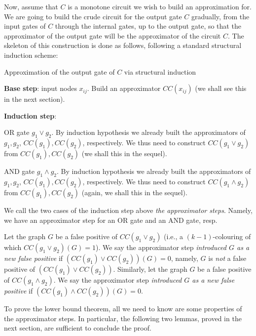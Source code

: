  

Now, assume that $C$ is a monotone circuit we wish to build an approximation for. We are going to build the crude circuit for the output gate $C$ gradually, from the input gates of $C$  through the internal gates, up to the output gate, so that the approximator of the output gate will be the approximator of the circuit $C$. The skeleton of this construction is done as follows, following a standard structural induction scheme:

\begin{trailer}
{Approximation of the output gate of $C$ via structural induction}

\textbf{Base step}: input nodes $x_{ij}$. Build an approximator $CC(x_{ij})$ (we shall see this in the next section).


\textbf{Induction step}: 

 OR gate $g_1\lor g_2$. By induction hypothesis we already built the approximators of $g_1,g_2$, $CC(g_1),CC(g_2)$, respectively. We thus need to construct $CC(g_1\lor g_2)$ from $CC(g_1),CC(g_2)$ (we shall this in the sequel).

 AND gate $g_1\land g_2$. 
By induction hypothesis we already built the approximators 
of $g_1,g_2$, $CC(g_1),CC(g_2)$, respectively. 
We thus need to construct $CC(g_1\land g_2)$ from 
$CC(g_1),CC(g_2)$ (again, we shall this in the sequel).
\end{trailer}

 We call the two cases of the induction step above \emph{the approximator steps}. Namely, we have an approximator step for an OR gate and an AND gate, resp. 

Let the graph $G$ be a false positive of $CC(g_1\lor g_2)$ (i.e., a $(k-1)$-colouring of which $CC(g_1\lor g_2)(G)=1$).
We say the approximator step \emph{introduced $G$ as a new false positive} if $(CC(g_1)\lor CC(g_2))(G)=0$, namely, $G$ is \emph{not} a false positive of $(CC(g_1)\lor CC(g_2))$.
Similarly, let the graph $G$ be a false positive of $CC(g_1\land g_2)$. We say the approximator step \emph{introduced $G$ as a new false positive} if $(CC(g_1)\land CC(g_2))(G)=0$.

To prove the lower bound theorem, all we need to know are some properties of the approximator steps. In particular, the following two lemmas, proved in the next section, are sufficient to conclude the proof.   








